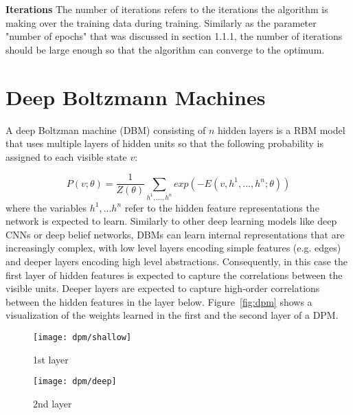 \documentclass[conference,compsoc]{IEEEtran}
\begin{document}




\textbf{Iterations} The number of iterations refers to the iterations the algorithm is making over the training data during training. Similarly as the parameter "number of epochs" that was discussed in section 1.1.1, the number of iterations should be large enough so that the algorithm can converge to the optimum.


\section{Deep Boltzmann Machines}
A deep Boltzman machine (DBM) consisting of $n$ hidden layers is a RBM model that uses multiple layers of hidden units so that the following probability is assigned to each visible state $v$:

\begin{equation}
P(v;\theta)=\frac{1}{Z(\theta)} \sum_{h^1,...,h^n}{exp(-E(v,h^1,...,h^n;\theta))}
\end{equation}
where the variables $h^1,...h^n$ refer to the hidden feature representations the network is expected to learn. Similarly to other deep learning models like deep CNNs or deep belief networks, DBMs can learn internal representations that are increasingly complex, with low level layers encoding simple features (e.g. edges) and deeper layers encoding high level abstractions. Consequently, in this case the first layer of hidden features is expected to capture the correlations between the visible units. Deeper layers are expected to capture high-order correlations between the hidden features in the layer below.
Figure~\ref{fig:dpm} shows a visualization of the weights learned in the first and the second layer of a DPM. 

    \begin{figure*}[]
        \centering
        \begin{subfigure}{0.30\linewidth}
            \texttt{[image: dpm/shallow]}
            \caption{1st layer}
        \end{subfigure}
         \begin{subfigure}{0.30\linewidth}
            \texttt{[image: dpm/deep]}
            \caption{2nd layer}
        \end{subfigure}  
        		        
        \caption{Visualizing the filters learned in the first layer (a) and in the second layer (b) of a Deep Restricted Boltzman Machine}
        \label{fig:dpm}
\end{figure*}
\end{document}
